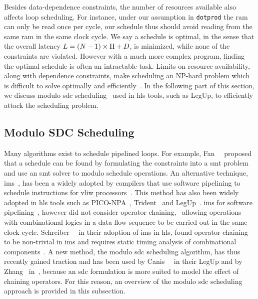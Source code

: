 Besides data-dependence constraints, the number of resources available also
affects loop scheduling.  For instance, under our assumption in \verb|dotprod|
the \gls{ram} can only be read once per cycle, our schedule thus should avoid
reading from the same \gls{ram} in the same clock cycle.  We say a schedule is
optimal, in the sense that the overall latency $L = (N - 1) \times \mathrm{II} + D$,
is minimized, while none of the constraints are violated.  However with a much
more complex program, finding the optimal schedule is often an intractable
task.  Limits on resource availability, along with dependence constraints,
make scheduling an NP-hard problem which is difficult to solve optimally and
efficiently~\cite{hwang91}.  In the following part of this section, we discuss
modulo \gls{sdc} scheduling~\cite{zhang13, canis14} used in \gls{hls} tools,
such as LegUp, to efficiently attack the scheduling problem.


\subsection{Modulo SDC Scheduling}
\label{bg:sub:sdc}

Many algorithms exist to schedule pipelined loops.  For example,
Fan~\etal~\cite{fan08} proposed that a schedule can be found by formulating
the constraints into a \gls{smt} problem and use an \gls{smt} solver to modulo
schedule operations.  An alternative technique, \gls{ims}~\cite{rau94}, has
been a widely adopted by compilers that use software pipelining to schedule
instructions for \gls{vliw} processors~\cite{mcnairy03}.  This method has also
been widely adopted in \gls{hls} tools such as PICO-NPA~\cite{schreiber02},
Trident~\cite{tripp05} and LegUp~\cite{canis13, canis14}.  \Gls{ims} for
software pipelining~\cite{rau94}, however did not consider operator chaining,
\ie~allowing operations with combinational logics in a data-flow sequence to
be carried out in the same clock cycle.  Schreiber~\etal~\cite{schreiber02}
in their adoption of \gls{ims} in \gls{hls}, found operator chaining
to be non-trivial in \gls{ims} and requires static timing analysis of
combinational components~\cite{canis14}.  A new method, the modulo \gls{sdc}
scheduling algorithm, has thus recently gained traction and has been
used by Canis~\etal~\cite{canis14} in their LegUp and by Zhang~\etal{}
in~\cite{zhang13}, because an \gls{sdc} formulation is more suited to model
the effect of chaining operators.  For this reason, an overview of the modulo
\gls{sdc} scheduling approach is provided in this subsection.

